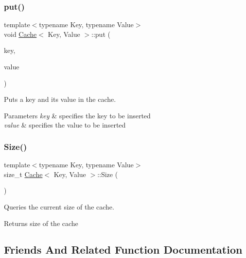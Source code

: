 \subsubsection{\texorpdfstring{put()}{put()}}
{\footnotesize\ttfamily template$<$typename Key, typename Value$>$ \\
void \hyperlink{classCache}{Cache}$<$ Key, Value $>$\+::put (\begin{DoxyParamCaption}\item[{const Key \&}]{key,  }\item[{const Value \&}]{value }\end{DoxyParamCaption})\hspace{0.3cm}{\ttfamily [inline]}}



Puts a key and its value in the cache. 


\begin{DoxyParams}{Parameters}
{\em key} & specifies the key to be inserted \\
\hline
{\em value} & specifies the value to be inserted \\
\hline
\end{DoxyParams}
\mbox{\label{classCache_a6b13a48d9bc1217c9408e66543655e67}} 
\subsubsection{\texorpdfstring{Size()}{Size()}}
{\footnotesize\ttfamily template$<$typename Key, typename Value$>$ \\
size\+\_\+t \hyperlink{classCache}{Cache}$<$ Key, Value $>$\+::Size (\begin{DoxyParamCaption}{ }\end{DoxyParamCaption})\hspace{0.3cm}{\ttfamily [inline]}}



Queries the current size of the cache. 

\begin{DoxyReturn}{Returns}
size of the cache 
\end{DoxyReturn}


\subsection{Friends And Related Function Documentation}
\mbox{\label{classCache_a11049cc49065d8bad3f6154e155922f1}} 

